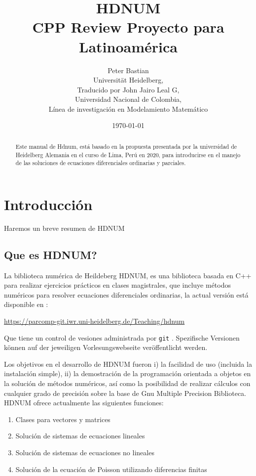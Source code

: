 \documentclass[a4paper,11pt]{article}
\title{HDNUM\\ CPP Review Proyecto para Latinoamérica}
\author{Peter Bastian\\
  Universität Heidelberg, \\
  Traducido por John Jairo Leal G,\\
  Universidad Nacional de Colombia, \\
  Línea de investigación en Modelamiento Matemático\\
}
\date{\today}
\theoremstyle{definition}
\begin{document}
\maketitle



\begin{abstract}
Este manual de Hdnum, está basado en la propuesta presentada por la universidad de 
Heidelberg Alemania en el curso de Lima, Perú en 2020, para introducirse en el manejo de las soluciones de ecuaciones
diferenciales ordinarias y parciales.
\end{abstract}


\section{Introducción}
Haremos un breve resumen de HDNUM
\subsection{Que es HDNUM?}
La biblioteca numérica de Heildeberg HDNUM, es una biblioteca basada en C++ para realizar ejercicios prácticos en clases
magistrales, que incluye métodos numéricos para resolver ecuaciones diferenciales ordinarias, la actual versión está 
disponible en :
\begin{center}
\url{https://parcomp-git.iwr.uni-heidelberg.de/Teaching/hdnum}
\end{center}

Que tiene un control de vesiones administrada por \lstinline{git} .
Spezifische Versionen können auf der jeweiligen Vorlesungswebseite veröffentlicht werden.

Los objetivos en el desarrollo de HDNUM fueron i) la facilidad de uso (incluida la instalación simple), ii) la demostración de la programación orientada a objetos en la solución de métodos numéricos, así como la posibilidad de realizar cálculos con cualquier grado de precisión sobre la base de Gnu Multiple Precision Biblioteca. HDNUM ofrece actualmente las siguientes funciones:
\begin{enumerate}[1)]
\item Clases para vectores y matrices
\item Solución de sistemas de ecuaciones lineales
\item Solución de sistemas de ecuaciones no lineales
\item Solución de la ecuación de Poisson utilizando diferencias finitas
\end{enumerate}
\end{document}
